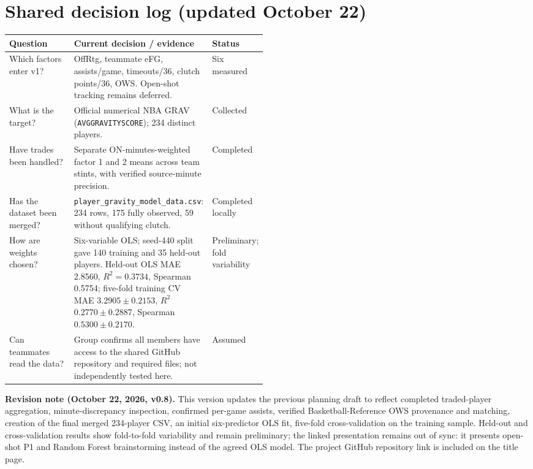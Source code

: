 \documentclass[11pt]{article}
\begin{document}
\section*{Shared decision log (updated October 22)}
\begin{center}
\small
\begin{tabularx}{\linewidth}{@{}p{0.29\linewidth}Xp{0.20\linewidth}@{}}
\toprule
\textbf{Question} & \textbf{Current decision / evidence} & \textbf{Status}\\
\midrule
Which factors enter v1? & OffRtg, teammate eFG, assists/game, timeouts/36, clutch points/36, OWS. Open-shot tracking remains deferred. & Six measured\\
What is the target? & Official numerical NBA GRAV (\texttt{AVGGRAVITYSCORE}); 234 distinct players. & Collected\\
Have trades been handled? & Separate ON-minutes-weighted factor 1 and 2 means across team stints, with verified source-minute precision. & Completed\\
Has the dataset been merged? & \texttt{player\_gravity\_model\_data.csv}: 234 rows, 175 fully observed, 59 without qualifying clutch. & Completed locally\\
How are weights chosen? & Six-variable OLS; seed-440 split gave 140 training and 35 held-out players. Held-out OLS MAE 2.8560, $R^2=0.3734$, Spearman 0.5754; five-fold training CV MAE $3.2905\pm0.2153$, $R^2$ $0.2770\pm0.2887$, Spearman $0.5300\pm0.2170$. & Preliminary; fold variability\\
Can teammates read the data? & Group confirms all members have access to the shared GitHub repository and required files; not independently tested here. & Assumed\\
\bottomrule
\end{tabularx}
\end{center}

\textbf{Revision note (October 22, 2026, v0.8).} This version updates
the previous planning draft to reflect completed traded-player aggregation,
minute-discrepancy inspection, confirmed per-game assists, verified
Basketball-Reference OWS provenance and matching, creation of the final
merged 234-player CSV, an initial six-predictor OLS fit, five-fold
cross-validation on the training sample. Held-out and cross-validation
results show fold-to-fold variability and remain preliminary; the linked
presentation remains out of sync: it presents open-shot P1 and Random
Forest brainstorming instead of the agreed OLS model. The project GitHub
repository link is included on the title page.
\end{document}
